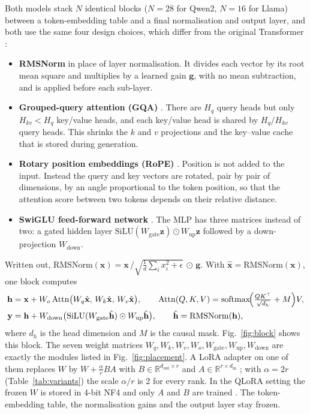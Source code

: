 \documentclass[12pt]{report}
\begin{document}
Both models stack $N$ identical blocks ($N=28$ for Qwen2, $N=16$ for Llama) between a token-embedding table and a final normalisation and output layer, and both use the same four design choices, which differ from the original Transformer \cite{vaswani2017}:
\begin{itemize}[leftmargin=0.5in, itemsep=2pt]
  \item \textbf{RMSNorm} \cite{zhang2019rmsnorm} in place of layer normalisation. It divides each vector by its root mean square and multiplies by a learned gain $\mathbf{g}$, with no mean subtraction, and is applied before each sub-layer.
  \item \textbf{Grouped-query attention (GQA)} \cite{ainslie2023gqa}. There are $H_q$ query heads but only $H_{kv}<H_q$ key/value heads, and each key/value head is shared by $H_q/H_{kv}$ query heads. This shrinks the $k$ and $v$ projections and the key--value cache that is stored during generation.
  \item \textbf{Rotary position embeddings (RoPE)} \cite{su2024rope}. Position is not added to the input. Instead the query and key vectors are rotated, pair by pair of dimensions, by an angle proportional to the token position, so that the attention score between two tokens depends on their relative distance.
  \item \textbf{SwiGLU feed-forward network} \cite{shazeer2020glu}. The MLP has three matrices instead of two: a gated hidden layer $\mathrm{SiLU}(W_{\text{gate}}\mathbf{z})\odot W_{\text{up}}\mathbf{z}$ followed by a down-projection $W_{\text{down}}$.
\end{itemize}
Written out, $\mathrm{RMSNorm}(\mathbf{x})=\mathbf{x}\,\big/\sqrt{\tfrac{1}{d}\sum_i x_i^2+\epsilon}\,\odot\,\mathbf{g}$. With $\hat{\mathbf{x}}=\mathrm{RMSNorm}(\mathbf{x})$, one block computes
\begin{align}
\mathbf{h} &= \mathbf{x} + W_o\,\mathrm{Attn}\bigl(W_q\hat{\mathbf{x}},\,W_k\hat{\mathbf{x}},\,W_v\hat{\mathbf{x}}\bigr), \qquad \mathrm{Attn}(Q,K,V)=\mathrm{softmax}\!\Bigl(\tfrac{QK^{\top}}{\sqrt{d_h}}+M\Bigr)V,\\
\mathbf{y} &= \mathbf{h} + W_{\text{down}}\bigl(\mathrm{SiLU}(W_{\text{gate}}\hat{\mathbf{h}})\odot W_{\text{up}}\hat{\mathbf{h}}\bigr), \qquad \hat{\mathbf{h}}=\mathrm{RMSNorm}(\mathbf{h}),
\end{align}
where $d_h$ is the head dimension and $M$ is the causal mask. Fig.~\ref{fig:block} shows this block. The seven weight matrices $W_q,W_k,W_v,W_o,W_{\text{gate}},W_{\text{up}},W_{\text{down}}$ are exactly the modules listed in Fig.~\ref{fig:placement}. A LoRA adapter on one of them replaces $W$ by $W+\tfrac{\alpha}{r}BA$ with $B\in\mathbb{R}^{d_{\text{out}}\times r}$ and $A\in\mathbb{R}^{r\times d_{\text{in}}}$ \cite{hu2022}; with $\alpha=2r$ (Table~\ref{tab:variants}) the scale $\alpha/r$ is 2 for every rank. In the QLoRA setting the frozen $W$ is stored in 4-bit NF4 and only $A$ and $B$ are trained \cite{dettmers2023}. The token-embedding table, the normalisation gains and the output layer stay frozen.
\end{document}
